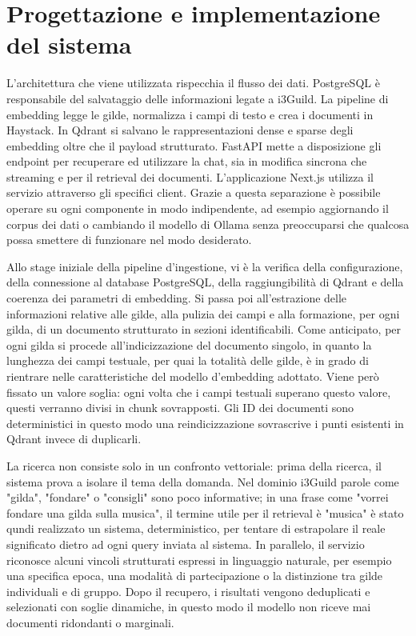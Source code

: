 \documentclass[12pt,a4paper]{article}
\begin{document}
\section*{Progettazione e implementazione del sistema}

L'architettura che viene utilizzata rispecchia il flusso dei dati. PostgreSQL è 
responsabile del salvataggio delle informazioni legate a i3Guild. La pipeline 
di embedding legge le gilde, normalizza i campi di testo e crea i documenti in 
Haystack. In Qdrant si salvano le rappresentazioni dense e sparse degli embedding oltre che il payload 
strutturato. FastAPI mette a disposizione gli endpoint per recuperare ed utilizzare la chat, 
sia in modifica sincrona che streaming e per il retrieval dei documenti. 
L'applicazione Next.js utilizza il servizio attraverso gli specifici client.
Grazie a questa separazione è possibile operare su ogni componente in modo indipendente, ad esempio
aggiornando il corpus dei dati o cambiando il modello di Ollama senza preoccuparsi che qualcosa
possa smettere di funzionare nel modo desiderato.


Allo stage iniziale della pipeline d'ingestione, vi è la verifica della configurazione, 
della connessione al database PostgreSQL, della raggiungibilità di Qdrant e della coerenza 
dei parametri di embedding. Si passa poi all'estrazione delle informazioni relative alle gilde, 
alla pulizia dei campi e alla formazione, per ogni gilda, di un documento strutturato in sezioni identificabili. 
Come anticipato, per ogni gilda si procede all'indicizzazione del documento singolo, in 
quanto la lunghezza dei campi testuale, per quai la totalità delle gilde, è in grado di rientrare nelle caratteristiche del 
modello d'embedding adottato. Viene però fissato un valore soglia: ogni volta che i campi testuali superano 
questo valore, questi verranno divisi in chunk sovrapposti. Gli ID dei documenti sono
deterministici in questo modo una reindicizzazione sovrascrive i punti esistenti in
Qdrant invece di duplicarli.

La ricerca non consiste solo in un confronto vettoriale: prima della ricerca, il sistema prova a isolare
il tema della domanda. Nel dominio i3Guild parole come "gilda",
"fondare" o "consigli" sono poco informative; in una frase come "vorrei
fondare una gilda sulla musica", il termine utile per il retrieval è "musica" è stato qundi realizzato un sistema, 
deterministico, per tentare di estrapolare il reale significato dietro ad ogni query inviata al sistema.
In parallelo, il servizio riconosce alcuni vincoli strutturati espressi in
linguaggio naturale, per esempio una specifica epoca, una modalità di partecipazione o la distinzione
tra gilde individuali e di gruppo. Dopo il recupero, i risultati vengono
deduplicati e selezionati con soglie dinamiche, in questo modo il modello non riceve
mai documenti ridondanti o marginali.
\end{document}
